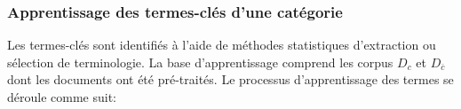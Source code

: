 



\subsubsection{Apprentissage des termes-clés d'une catégorie}
Les termes-clés sont identifiés à l'aide de méthodes statistiques d'extraction ou sélection de terminologie. La base d'apprentissage comprend les corpus $D_c$ et $D_{\overline{c}}$ dont les documents ont été pré-traités. %
 Le processus d'apprentissage des termes se déroule comme suit:
 
